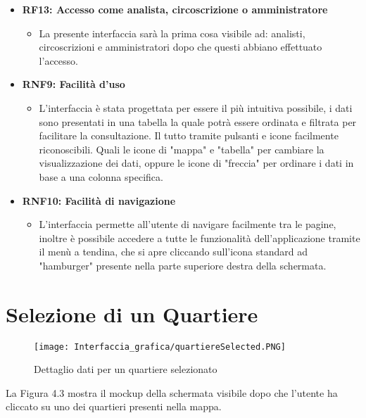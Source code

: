 \begin{itemize}
        \item \textbf{RF13: Accesso come analista, circoscrizione o amministratore} \begin{itemize}
            \item La presente interfaccia sarà la prima cosa visibile ad: analisti, circoscrizioni e amministratori dopo che questi abbiano effettuato l'accesso.
        \end{itemize}
        \item \textbf{RNF9: Facilità d’uso} \begin{itemize}
            \item L'interfaccia è stata progettata per essere il più intuitiva possibile, i dati sono presentati in una tabella la quale potrà essere ordinata e filtrata per facilitare la consultazione. Il tutto tramite pulsanti e icone facilmente riconoscibili. Quali le icone di "mappa" e "tabella" per cambiare la visualizzazione dei dati, oppure le icone di "freccia" per ordinare i dati in base a una colonna specifica.
        \end{itemize}
        \item \textbf{RNF10: Facilità di navigazione} \begin{itemize}
            \item L'interfaccia permette all'utente di navigare facilmente tra le pagine, inoltre è possibile accedere a tutte le funzionalità dell'applicazione tramite il menù a tendina, che si apre cliccando sull'icona standard ad "hamburger" presente nella parte superiore destra della schermata.
            \end{itemize}
    \end{itemize}
\newpage
\section{Selezione di un Quartiere}
    \begin{figure}[H]
        \center
        \texttt{[image: Interfaccia\_grafica/quartiereSelected.PNG]}
        \caption{Dettaglio dati per un quartiere selezionato}
    \end{figure}    

    La Figura 4.3 mostra il mockup della schermata visibile dopo che l'utente ha cliccato su uno dei quartieri presenti nella mappa.

